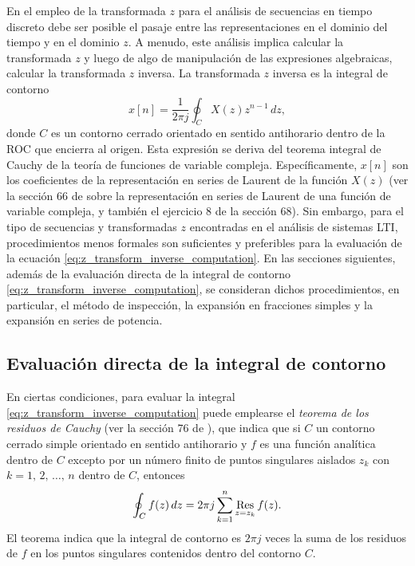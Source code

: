 \documentclass[a4paper]{report}
\def\Res{\qopname\relax m{Res}}
\begin{document}
En el empleo de la transformada \(z\) para el análisis de secuencias en tiempo discreto debe ser posible el pasaje entre las representaciones en el dominio del tiempo y en el dominio \(z\). A menudo, este análisis implica calcular la transformada \(z\) y luego de algo de manipulación de las expresiones algebraicas, calcular la transformada \(z\) inversa. La transformada \(z\) inversa es la integral de contorno
\begin{equation}\label{eq:z_transform_inverse_computation}
 x[n]=\frac{1}{2\pi j}\oint_C X(z)z^{n-1}\,dz, 
\end{equation}
donde \(C\) es un contorno cerrado orientado en sentido antihorario dentro de la ROC que encierra al origen. Esta expresión se deriva del teorema integral de Cauchy de la teoría de funciones de variable compleja. Específicamente, \(x[n]\) son los coeficientes de la representación en series de Laurent de la función \(X(z)\) (ver la sección 66 de \cite{brown2013complex} sobre la representación en series de Laurent de una función de variable compleja, y también el ejercicio 8 de la sección 68). Sin embargo, para el tipo de secuencias y transformadas \(z\) encontradas en el análisis de sistemas LTI, procedimientos menos formales son suficientes y preferibles para la evaluación de la ecuación  \ref{eq:z_transform_inverse_computation}. En las secciones siguientes, además de la evaluación directa de la integral de contorno \ref{eq:z_transform_inverse_computation}, se consideran dichos procedimientos, en particular, el método de inspección, la expansión en fracciones simples y la expansión en series de potencia.

\subsection{Evaluación directa de la integral de contorno}

En ciertas condiciones, para evaluar la integral \ref{eq:z_transform_inverse_computation} puede emplearse el \emph{teorema de los residuos de Cauchy} (ver la sección 76 de \cite{brown2013complex}), que indica que si \(C\) un contorno cerrado simple orientado en sentido antihorario y \(f\) es una función analítica dentro de \(C\) excepto por un número finito de puntos singulares aislados \(z_k\) con \(k=1,\,2,\,\dots,\,n\) dentro de \(C\), entonces
\begin{equation}\label{eq:z_transform_cauchy_residue_theorem}
 \oint_C f(z)\,dz=2\pi j\sum_{k=1}^n \Res_{z=z_k}f(z). 
\end{equation} 
El teorema indica que la integral de contorno es \(2\pi j\) veces la suma de los residuos de \(f\) en los puntos singulares contenidos dentro del contorno \(C\).
\end{document}
